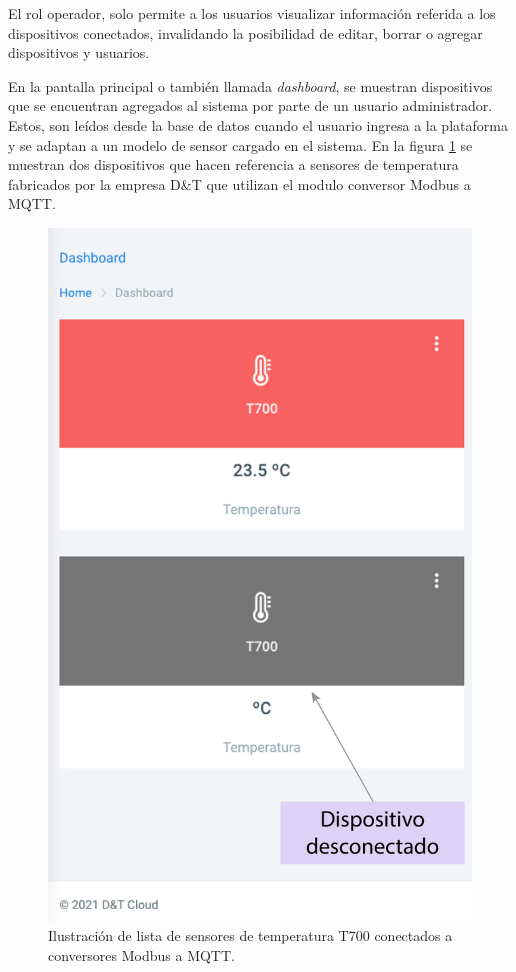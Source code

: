 El rol operador, solo permite a los usuarios visualizar información referida a los dispositivos conectados, invalidando la posibilidad de editar, borrar o agregar dispositivos y usuarios.


En la pantalla principal o también llamada \textit{dashboard}, se muestran dispositivos que se encuentran agregados al sistema por parte de un usuario administrador. Estos, son leídos desde la base de datos cuando el usuario ingresa a la plataforma y se adaptan a un modelo de sensor cargado en el sistema. En la figura \ref{fig:dashboard} se muestran dos dispositivos que hacen referencia a sensores de temperatura fabricados por la empresa D\&T que utilizan el modulo conversor Modbus a MQTT.
\pagebreak
 \begin{figure}[htpb]
	\centering
	\includegraphics[scale=.7]{./Figures/dashboard.png}
	\caption[Pantalla principal - \textit{dashboard}]{Ilustración de lista de sensores de temperatura T700 conectados a conversores Modbus a MQTT. }
	\label{fig:dashboard}
\end{figure}




